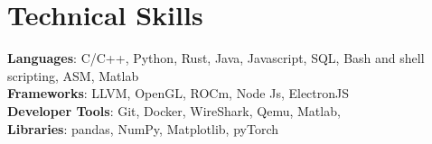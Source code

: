 \documentclass[letterpaper,11pt]{article}
\begin{document}
\section{Technical Skills}
 \begin{itemize}[leftmargin=0.15in, label={}]
    \small{\item{
     \textbf{Languages}{: C/C++, Python, Rust, Java, Javascript, SQL, Bash and shell scripting, ASM, Matlab} \\
     \textbf{Frameworks}{: LLVM, OpenGL, ROCm, Node Js,  ElectronJS} \\
     \textbf{Developer Tools}{: Git, Docker, WireShark, Qemu, Matlab,} \\
      \textbf{Libraries}{: pandas, NumPy, Matplotlib, pyTorch}
    }}
 \end{itemize}


\end{document}
